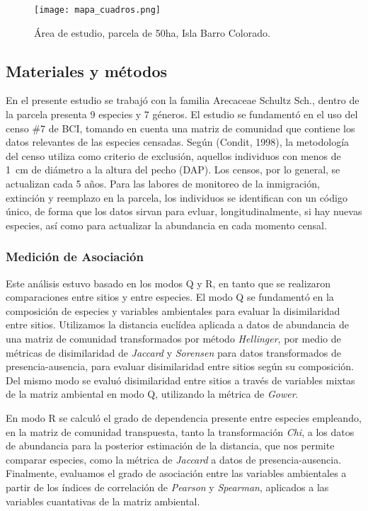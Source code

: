 \documentclass[11pt,]{article}
\begin{document}
\begin{figure}
\centering
\texttt{[image: mapa\_cuadros.png]}
\caption{Área de estudio, parcela de 50ha, Isla Barro Colorado.
\label{fig:mapa_cuadros}}
\end{figure}

\subsection{Materiales y métodos}\label{materiales-y-muxe9todos}

En el presente estudio se trabajó con la familia Arecaceae Schultz Sch.,
dentro de la parcela presenta 9 especies y 7 géneros. El estudio se
fundamentó en el uso del censo \#7 de BCI, tomando en cuenta una matriz
de comunidad que contiene los datos relevantes de las especies censadas.
Según (Condit, 1998), la metodología del censo utiliza como criterio de
exclusión, aquellos individuos con menos de 1~cm de diámetro a la altura
del pecho (DAP). Los censos, por lo general, se actualizan cada 5 años.
Para las labores de monitoreo de la inmigración, extinción y reemplazo
en la parcela, los individuos se identifican con un código único, de
forma que los datos sirvan para evluar, longitudinalmente, si hay nuevas
especies, así como para actualizar la abundancia en cada momento censal.

\subsubsection{Medición de
Asociación}\label{mediciuxf3n-de-asociaciuxf3n}

Este análisis estuvo basado en los modos Q y R, en tanto que se
realizaron comparaciones entre sitios y entre especies. El modo Q se
fundamentó en la composición de especies y variables ambientales para
evaluar la disimilaridad entre sitios. Utilizamos la distancia euclídea
aplicada a datos de abundancia de una matriz de comunidad transformados
por método \emph{Hellinger}, por medio de métricas de disimilaridad de
\emph{Jaccard} y \emph{Sorensen} para datos transformados de
presencia-ausencia, para evaluar disimilaridad entre sitios según su
composición. Del mismo modo se evaluó disimilaridad entre sitios a
través de variables mixtas de la matriz ambiental en modo Q, utilizando
la métrica de \emph{Gower}.

En modo R se calculó el grado de dependencia presente entre especies
empleando, en la matriz de comunidad transpuesta, tanto la
transformación \emph{Chi}, a los datos de abundancia para la posterior
estimación de la distancia, que nos permite comparar especies, como la
métrica de \emph{Jaccard} a datos de presencia-ausencia. Finalmente,
evaluamos el grado de asociación entre las variables ambientales a
partir de los índices de correlación de \emph{Pearson} y
\emph{Spearman}, aplicados a las variables cuantativas de la matriz
ambiental.
\end{document}
